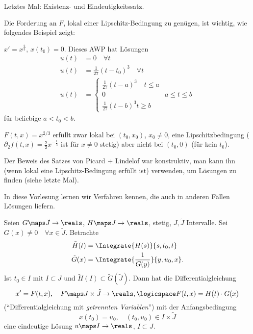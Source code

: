 Letztes Mal: Existenz- und Eindeutigkeitssatz.

Die Forderung an \( F \), lokal einer Lipschitz-Bedingung zu genügen, ist wichtig, wie folgendes Beispiel zeigt:
\begin{beispiel*}
  \( x'=x^{\frac{2}{3}} \), \( x(t_0)=0 \). Dieses AWP hat Lösungen
  \begin{align*}
    u(t)&=0\quad \forall t\\
    u(t)&=\frac{1}{27}(t-t_0)^3\quad \forall t\\
    u(t)&=\begin{cases}
      \frac{1}{27}(t-a)^3\quad t\leq a\\
      0&a\leq t\leq b\\
      \frac{1}{27}(t-b)^3 t\geq b
    \end{cases}
  \end{align*}
  für beliebige \( a<t_0<b \).

  \( F(t,x)=x^{2/3} \) erfüllt zwar lokal bei \( (t_0,x_0) \), \( x_0\neq 0 \), eine Lipschitzbedingung (\( \partial_2 f(t,x)=\frac{2}{3}x^{-\frac{1}{3}} \) ist für \( x\neq 0 \) stetig) aber nicht bei \( (t_0,0) \) (für kein \( t_0 \)).

  Der Beweis des Satzes von Picard + Lindelof war konstruktiv, \dh man kann ihn (wenn lokal eine Lipschitz-Bedingung erfüllt ist) verwenden, um Lösungen zu finden (siehe letzte Mal).

  In diese Vorlesung lernen wir Verfahren kennen, die auch in anderen Fällen Lösungen liefern.
\end{beispiel*}
\begin{lemma}\label{dgl_mit_getrennten_variablen}
  Seien \( G\maps \tilde{J}\to \reals \), \( H\maps J\to \reals \), stetig, \( J,\tilde{J} \) Intervalle. Sei \( G(x)\neq 0\quad \forall x\in \tilde{J} \). 
  Betrachte 
  \begin{align*}
    \tilde{H}(t)&=\Integrate{H(s)}{s,t_0,t}\\
    \tilde{G}(x)&=\Integrate{\frac{1}{G(y)}}{y,u_0,x}.
  \end{align*}
  Ist \( t_0\in I \) mit \( I\subset J \) und \( \boxed{\tilde{H}(I)\subset\tilde{G}(\tilde{J})} \). Dann hat die Differentialgleichung
  \begin{equation*}
    x'=F(t,x),\quad F\maps J\times \tilde{J}\to \reals,\logicspace F(t,x)=H(t)\cdot G(x)
  \end{equation*}
  (\enquote{Differentialgleichung mit \emph{getrennten Variablen}}) mit der Anfangsbedingung
  \begin{equation*}
    x(t_0)=u_0, \quad (t_0,u_0)\in I\times \tilde{J}
  \end{equation*}
  eine eindeutige Lösung \( u\maps I\to \reals \), \( I\subset J \).
\end{lemma}
